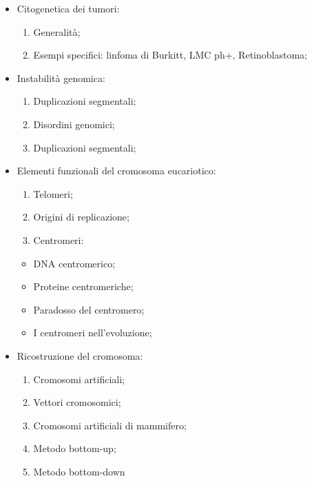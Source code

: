 \documentclass[11pt]{book}
\begin{document}
\begin{itemize}
\item 
Citogenetica dei tumori:

	\begin{enumerate}
	\item
	Generalità;
    \item
    Esempi specifici: linfoma di Burkitt, LMC ph+, Retinoblastoma;
    \end{enumerate}
    
\item
Instabilità genomica:

	\begin{enumerate}
	\item
    Duplicazioni segmentali;
    \item
    Disordini genomici;
    \item
    Duplicazioni segmentali;
    \end{enumerate}
    
\item
Elementi funzionali del cromosoma eucariotico:

	\begin{enumerate}
    \item
    Telomeri;
    \item
    Origini di replicazione;
    \item
    Centromeri:
    \end{enumerate}
    	
		\begin{itemize}
        \item
        DNA centromerico;
        \item
        Proteine centromeriche;
        \item
        Paradosso del centromero;
        \item
        I centromeri nell’evoluzione;
        \end{itemize}
        
\item
Ricostruzione del cromosoma:
	
	\begin{enumerate}
    \item
    Cromosomi artificiali;
    \item
    Vettori cromosomici;
    \item
    Cromosomi artificiali di mammifero;
    \item
    Metodo bottom-up;
    \item
    Metodo bottom-down
    \end{enumerate}


\end{itemize}
\end{document}
